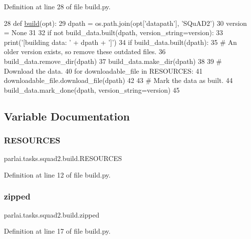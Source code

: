 Definition at line 28 of file build.\+py.


\begin{DoxyCode}
28 \textcolor{keyword}{def }\hyperlink{namespacedialog__babi__feedback_1_1build_a7a9d289f7493a5ded13c4b7f071b6184}{build}(opt):
29     dpath = os.path.join(opt[\textcolor{stringliteral}{'datapath'}], \textcolor{stringliteral}{'SQuAD2'})
30     version = \textcolor{keywordtype}{None}
31 
32     \textcolor{keywordflow}{if} \textcolor{keywordflow}{not} build\_data.built(dpath, version\_string=version):
33         print(\textcolor{stringliteral}{'[building data: '} + dpath + \textcolor{stringliteral}{']'})
34         \textcolor{keywordflow}{if} build\_data.built(dpath):
35             \textcolor{comment}{# An older version exists, so remove these outdated files.}
36             build\_data.remove\_dir(dpath)
37         build\_data.make\_dir(dpath)
38 
39         \textcolor{comment}{# Download the data.}
40         \textcolor{keywordflow}{for} downloadable\_file \textcolor{keywordflow}{in} RESOURCES:
41             downloadable\_file.download\_file(dpath)
42 
43         \textcolor{comment}{# Mark the data as built.}
44         build\_data.mark\_done(dpath, version\_string=version)
45 \end{DoxyCode}


\subsection{Variable Documentation}
\mbox{\label{namespaceparlai_1_1tasks_1_1squad2_1_1build_a7ec1a941e12afae17dd74dc22fd2538e}} 
\subsubsection{\texorpdfstring{R\+E\+S\+O\+U\+R\+C\+ES}{RESOURCES}}
{\footnotesize\ttfamily parlai.\+tasks.\+squad2.\+build.\+R\+E\+S\+O\+U\+R\+C\+ES}



Definition at line 12 of file build.\+py.

\mbox{\label{namespaceparlai_1_1tasks_1_1squad2_1_1build_a5086bb9e7aa7b98872a964e20c82b667}} 
\subsubsection{\texorpdfstring{zipped}{zipped}}
{\footnotesize\ttfamily parlai.\+tasks.\+squad2.\+build.\+zipped}



Definition at line 17 of file build.\+py.

